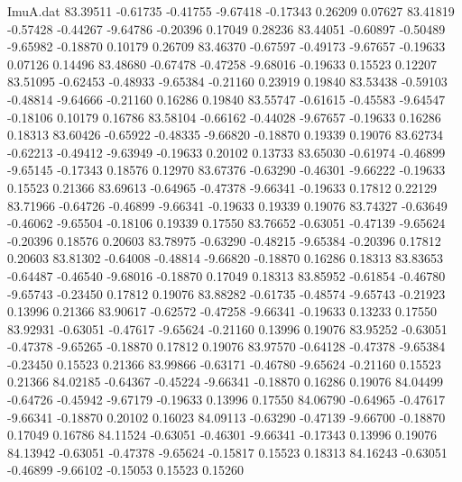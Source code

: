 \begin{filecontents}{ImuA.dat}
  83.39511   -0.61735   -0.41755   -9.67418   -0.17343    0.26209    0.07627
  83.41819   -0.57428   -0.44267   -9.64786   -0.20396    0.17049    0.28236
  83.44051   -0.60897   -0.50489   -9.65982   -0.18870    0.10179    0.26709
  83.46370   -0.67597   -0.49173   -9.67657   -0.19633    0.07126    0.14496
  83.48680   -0.67478   -0.47258   -9.68016   -0.19633    0.15523    0.12207
  83.51095   -0.62453   -0.48933   -9.65384   -0.21160    0.23919    0.19840
  83.53438   -0.59103   -0.48814   -9.64666   -0.21160    0.16286    0.19840
  83.55747   -0.61615   -0.45583   -9.64547   -0.18106    0.10179    0.16786
  83.58104   -0.66162   -0.44028   -9.67657   -0.19633    0.16286    0.18313
  83.60426   -0.65922   -0.48335   -9.66820   -0.18870    0.19339    0.19076
  83.62734   -0.62213   -0.49412   -9.63949   -0.19633    0.20102    0.13733
  83.65030   -0.61974   -0.46899   -9.65145   -0.17343    0.18576    0.12970
  83.67376   -0.63290   -0.46301   -9.66222   -0.19633    0.15523    0.21366
  83.69613   -0.64965   -0.47378   -9.66341   -0.19633    0.17812    0.22129
  83.71966   -0.64726   -0.46899   -9.66341   -0.19633    0.19339    0.19076
  83.74327   -0.63649   -0.46062   -9.65504   -0.18106    0.19339    0.17550
  83.76652   -0.63051   -0.47139   -9.65624   -0.20396    0.18576    0.20603
  83.78975   -0.63290   -0.48215   -9.65384   -0.20396    0.17812    0.20603
  83.81302   -0.64008   -0.48814   -9.66820   -0.18870    0.16286    0.18313
  83.83653   -0.64487   -0.46540   -9.68016   -0.18870    0.17049    0.18313
  83.85952   -0.61854   -0.46780   -9.65743   -0.23450    0.17812    0.19076
  83.88282   -0.61735   -0.48574   -9.65743   -0.21923    0.13996    0.21366
  83.90617   -0.62572   -0.47258   -9.66341   -0.19633    0.13233    0.17550
  83.92931   -0.63051   -0.47617   -9.65624   -0.21160    0.13996    0.19076
  83.95252   -0.63051   -0.47378   -9.65265   -0.18870    0.17812    0.19076
  83.97570   -0.64128   -0.47378   -9.65384   -0.23450    0.15523    0.21366
  83.99866   -0.63171   -0.46780   -9.65624   -0.21160    0.15523    0.21366
  84.02185   -0.64367   -0.45224   -9.66341   -0.18870    0.16286    0.19076
  84.04499   -0.64726   -0.45942   -9.67179   -0.19633    0.13996    0.17550
  84.06790   -0.64965   -0.47617   -9.66341   -0.18870    0.20102    0.16023
  84.09113   -0.63290   -0.47139   -9.66700   -0.18870    0.17049    0.16786
  84.11524   -0.63051   -0.46301   -9.66341   -0.17343    0.13996    0.19076
  84.13942   -0.63051   -0.47378   -9.65624   -0.15817    0.15523    0.18313
  84.16243   -0.63051   -0.46899   -9.66102   -0.15053    0.15523    0.15260

\end{filecontents}
